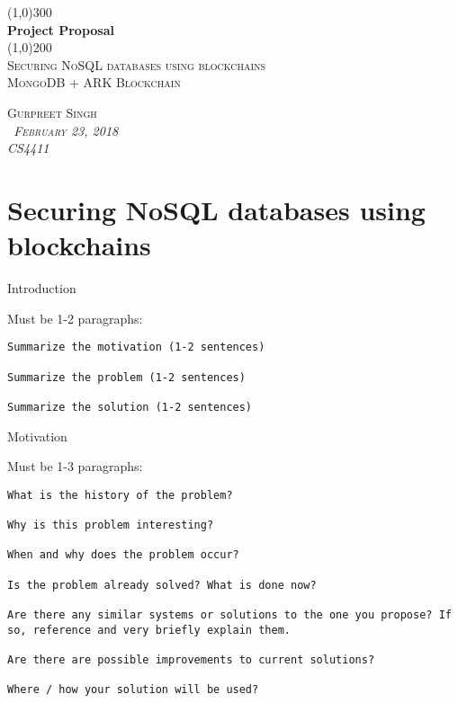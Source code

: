 \documentclass[11pt,]{article}
\begin{document}
\doublespacing

\begin{titlepage}
    \begin{center}
    \line(1,0){300} \\ 
    [0.25in]
    \huge{\bfseries Project Proposal} \\
    [2mm]
    \line(1,0){200} \\
    [1.5cm] 
    \textsc{\Large Securing NoSQL databases using blockchains} \\
    [0.75cm]
    \textsc{\Large MongoDB + ARK Blockchain} \\
    [9cm]
    \end{center}
    
    \begin{flushright}
    \textsc{\Large{Gurpreet Singh \\}\normalsize\emph{\ February 23, 2018 \\}\normalsize\emph{CS4411 \\} }
    
    \end{flushright}
    
\end{titlepage}

\newpage

\hypertarget{securing-nosql-databases-using-blockchains}{%
\section{Securing NoSQL databases using
blockchains}\label{securing-nosql-databases-using-blockchains}}

Introduction

Must be 1-2 paragraphs:

\begin{verbatim}
Summarize the motivation (1-2 sentences)

Summarize the problem (1-2 sentences)

Summarize the solution (1-2 sentences)
\end{verbatim}

Motivation

Must be 1-3 paragraphs:

\begin{verbatim}
What is the history of the problem?

Why is this problem interesting?

When and why does the problem occur?

Is the problem already solved? What is done now?

Are there any similar systems or solutions to the one you propose? If so, reference and very briefly explain them.

Are there are possible improvements to current solutions?

Where / how your solution will be used?
\end{verbatim}
\end{document}
